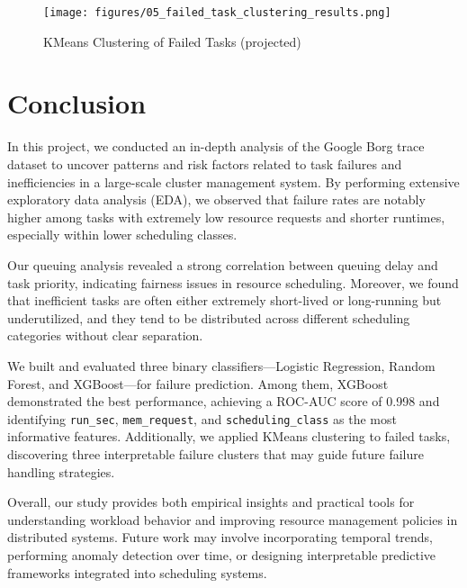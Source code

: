 \documentclass[a4paper,12pt]{article}
\begin{document}
\begin{figure}[h]
  \centering
  \texttt{[image: figures/05\_failed\_task\_clustering\_results.png]}
  \caption{KMeans Clustering of Failed Tasks (projected)}
  \label{fig:failed-clustering}
\end{figure}

\section{Conclusion}

In this project, we conducted an in-depth analysis of the Google Borg trace dataset to uncover patterns and risk factors related to task failures and inefficiencies in a large-scale cluster management system. By performing extensive exploratory data analysis (EDA), we observed that failure rates are notably higher among tasks with extremely low resource requests and shorter runtimes, especially within lower scheduling classes.

Our queuing analysis revealed a strong correlation between queuing delay and task priority, indicating fairness issues in resource scheduling. Moreover, we found that inefficient tasks are often either extremely short-lived or long-running but underutilized, and they tend to be distributed across different scheduling categories without clear separation.

We built and evaluated three binary classifiers—Logistic Regression, Random Forest, and XGBoost—for failure prediction. Among them, XGBoost demonstrated the best performance, achieving a ROC-AUC score of 0.998 and identifying \texttt{run\_sec}, \texttt{mem\_request}, and \texttt{scheduling\_class} as the most informative features. Additionally, we applied KMeans clustering to failed tasks, discovering three interpretable failure clusters that may guide future failure handling strategies.

Overall, our study provides both empirical insights and practical tools for understanding workload behavior and improving resource management policies in distributed systems. Future work may involve incorporating temporal trends, performing anomaly detection over time, or designing interpretable predictive frameworks integrated into scheduling systems.

\newpage

\end{document}
